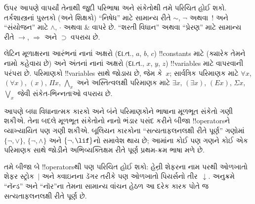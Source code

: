 \documentclass[../../../include/open-logic-section]{subfiles}
\begin{document}

\begin{intro}
ઉપર આપણે વાપર્યાં તેનાથી જુદી પરિભાષા અને સંકેતોથી તમે પરિચિત હોઈ
શકો. તર્કશાસ્ત્રનાં પુસ્તકો (અને શિક્ષકો) ``નિષેધ'' માટે સામાન્ય રીતે
$\sim$, $\neg$ અથવા~! અને ``સંયોજન'' માટે $\wedge$, $\cdot$ અથવા
$\&$ વાપરે છે. ``શરતી વિધાન'' અથવા ``પ્રેરણ'' માટે સામાન્ય રીતે
$\rightarrow$, $\Rightarrow$ અને $\supset$ વપરાય છે.

લેટિન મૂળાક્ષરના આરંભનાં નાનાં અક્ષરો (દા.ત., $a$, $b$, $c$)
!!{constant}s માટે (ક્યારેક તેમને નામો કહેવાય છે) અને અંતનાં નાનાં
અક્ષરો (દા.ત., $x$, $y$, $z$) !!{variable}s માટે વાપરવાની પરંપરા
છે. પરિમાણકો !!{variable}s સાથે જોડાય છે, જેમ કે~$x$; સાર્વત્રિક
પરિમાણક માટે $\forall x$, $(\forall x)$, $(x)$, $\Pi x$,
$\bigwedge_x$ અને અસ્તિત્વલક્ષી પરિમાણક માટે $\exists x$,
$(\exists x)$, $(Ex)$, $\Sigma x$, $\bigvee_x$ જેવી સંકેત-ભિન્નતાઓ
વપરાય છે.
\end{intro}

\begin{explain}
આપણે બધા વિધાનાત્મક કારકો અને બંને પરિમાણકોને ભાષાના મૂળભૂત સંકેતો
ગણી શકીએ. તેના બદલે મૂળભૂત સંકેતોનો નાનો ભંડાર પસંદ કરીને બીજા
!!{operator}sને વ્યાખ્યાયિત પણ ગણી શકીએ. બૂલિયન કારકોના
``સત્યતાફલનલક્ષી રીતે પૂર્ણ'' ગણોમાં $\{ \lnot, \lor \}$,
$\{ \lnot, \land \}$ અને $\{ \lnot, \lif\}$નો સમાવેશ થાય છે;
આમાંના કોઈ પણ ગણને કોઈ એક પરિમાણક સાથે જોડીને અભિવ્યક્તિક્ષમ રીતે
પૂર્ણ પ્રથમ-ક્રમ ભાષા મળે છે.

તમે બીજા બે !!{operator}sથી પણ પરિચિત હોઈ શકો: હેન્રી શેફરના નામ
પરથી ઓળખાતો શેફર સ્ટ્રોક~$|$ અને ક્વાઇનના ડૅગર તરીકે પણ ઓળખાતો
પિયર્સનો તીર~$\downarrow$. અનુક્રમે ``નૅન્ડ'' અને ``નૉર''ના તેમના
સામાન્ય વાંચન હેઠળ આ દરેક કારક પોતે જ સત્યતાફલનલક્ષી રીતે પૂર્ણ છે.
\end{explain}
\end{document}
